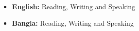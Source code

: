 

\begin{itemize}

	\item
	{\textbf{English:}  Reading, Writing and Speaking}
	
	\item
	{\textbf{Bangla:}  Reading, Writing and Speaking}
	
\end{itemize}